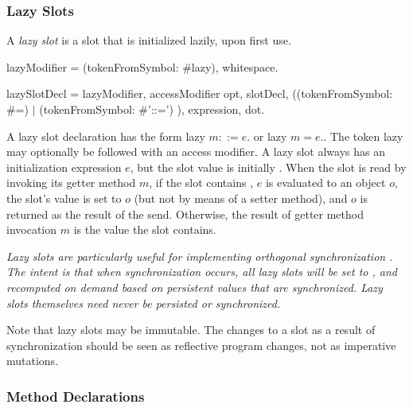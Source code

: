 \documentclass{article}
\newcommand{\code}[1]{{\sf #1}}
\begin{document}
\subsubsection{Lazy Slots}
\label{lazySlots}

A {\em lazy slot} is a  slot that is initialized lazily, upon first use. 

\begin{newspeak}
lazyModifier = (tokenFromSymbol: \#lazy), whitespace.

lazySlotDecl = lazyModifier, accessModifier opt, slotDecl, 
                    ((tokenFromSymbol: \#=) $|$ 
                      (tokenFromSymbol: \#'::=')
                     ), expression, dot.
\end{newspeak}

A lazy slot declaration has the form \code{lazy $m ::= e.$} or \code{lazy $m = e.$}. The token \code{lazy} may optionally be followed with an access modifier.
 A lazy slot  always has an initialization expression $e$, but the slot value is initially \NIL{}.
When the slot is read by invoking its getter method $m$, if the slot contains \NIL{}, $e$ is evaluated to an object $o$, the slot's value is set to $o$ (but not by means of a setter method), and $o$ is returned as the result of the send.  Otherwise, the result of getter method invocation $m$ is the value the slot contains.  


{\it 
Lazy slots are particularly useful for implementing {\em orthogonal synchronization} \cite{bracha05}. The intent is that when synchronization occurs, all lazy slots will be set to \NIL{}, and recomputed on demand based on persistent values that are synchronized. Lazy slots themselves need never be persisted or synchronized.

Note that lazy slots may be immutable. The changes to a slot as a result of synchronization should be seen as reflective program changes, not as imperative mutations.
}

\subsubsection{Method Declarations}
\label{methodDecls}
\end{document}
